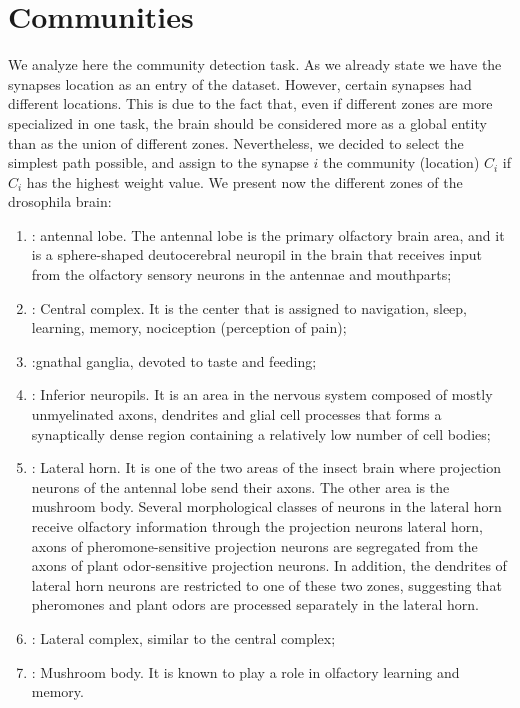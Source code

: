 \section{Communities \label{sec:comm}}
We analyze here the community detection task. As we already state we have the synapses location
as an entry of the dataset. However, certain synapses had different locations.
This is due to the fact that, even if different zones are more specialized 
in one task, the brain should be considered more as a global entity than as the union 
of different zones.
Nevertheless, we decided to select the simplest path possible, and assign to the synapse $i$ the community (location) $C_i$
if $C_i$ has the highest weight value. We present now the different zones of the 
drosophila brain: 
\begin{enumerate}
    \item {}: antennal lobe.
        The antennal lobe is the primary olfactory brain area, and it is a sphere-shaped 
        deutocerebral neuropil in the brain that receives input from the olfactory sensory neurons 
        in the antennae and mouthparts;
    \item {}: Central complex. It is the center that is assigned to
         navigation, sleep, learning, memory, nociception (perception of pain);
    \item {}:gnathal ganglia, devoted to taste and feeding;
    \item {}: Inferior neuropils. It is an area in the nervous system composed of mostly unmyelinated axons, dendrites and glial 
        cell processes that forms a synaptically dense region containing a relatively low number 
        of cell bodies;     
    \item {}: Lateral horn. It is one of the two areas of the insect brain where projection
         neurons of the antennal lobe send their axons. The other area is the mushroom body.
         Several morphological classes of neurons in the lateral horn receive olfactory 
         information through the projection neurons lateral horn, axons of 
         pheromone-sensitive projection neurons are segregated from the axons of 
         plant odor-sensitive projection neurons. In addition, the dendrites of lateral 
         horn neurons are restricted to one of these two zones, suggesting that pheromones 
         and plant odors are processed separately in the lateral horn.
    \item {}: Lateral complex, similar to the central complex;
    \item {}: Mushroom body. It is known to play a role in olfactory learning and memory. 

\end{enumerate}
